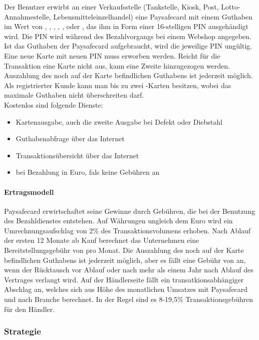 Der Benutzer erwirbt an einer Verkaufsstelle (Tankstelle, Kiosk, Post, Lotto-Annahmestelle, Lebensmitteleinzelhandel) eine Paysafecard mit einem Guthaben im Wert von , , , , ,  oder , das ihm in Form einer 16-stelligen PIN ausgehändigt wird. Die PIN wird während des Bezahlvorgangs bei einem Webshop angegeben. Ist das Guthaben der Paysafecard aufgebraucht, wird die jeweilige PIN ungültig. Eine neue Karte mit neuen PIN muss erworben werden. Reicht für die Transaktion eine Karte nicht aus, kann eine Zweite hinzugezogen werden. Auszahlung des noch auf der Karte befindlichen Guthabens ist jederzeit möglich. 
Als registrierter Kunde kann man bis zu zwei -Karten besitzen, wobei das maximale Guthaben nicht  überschreiten darf.
\\
Kostenlos sind folgende Dienste: 
\begin{itemize}
	\item   Kartenausgabe, auch die zweite Ausgabe bei Defekt oder Diebstahl
    \item   Guthabenabfrage über das Internet
    \item   Transaktionsübersicht über das Internet
    \item   bei Bezahlung in Euro, fals keine Gebühren an
\end{itemize}


\paragraph{Ertragsmodell}

Paysafecard erwirtschaftet seine Gewinne durch Gebühren, die bei der Benutzung des Bezahldienstes entstehen. Auf Währungen ungleich dem Euro wird ein Umrechnungsaufschlag von 2\% des Transaktionsvolumens erhoben. Nach Ablauf der ersten 12 Monate ab Kauf berechnet das Unternehmen eine Bereitstellungsgebühr von  pro Monat. Die Auszahlung des noch auf der Karte befindlichen Guthabens ist jederzeit möglich, aber es fällt eine Gebühr von  an, wenn der Rücktausch vor Ablauf oder nach mehr als einem Jahr nach Ablauf des Vertrages verlangt wird. Auf der Händlerseite fällt ein transatkionsabhängiger Abschlag an, welches sich aus Höhe des monatlichen Umsatzes mit Paysafecard und nach Branche berechnet. In der Regel sind es 8-19,5\% Transaktionsgebühren für den Händler.



\subsubsection{Strategie}

